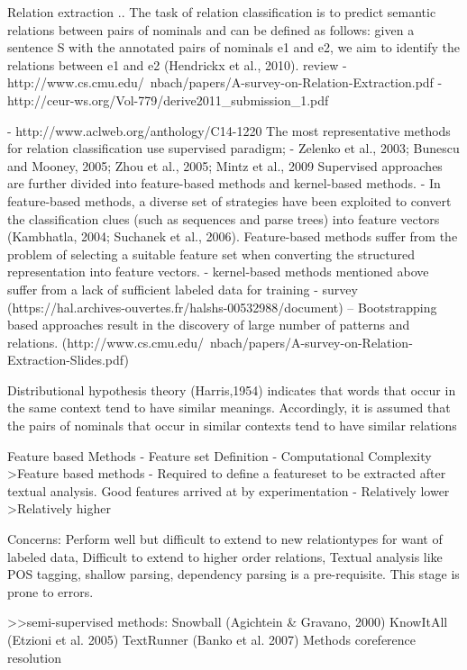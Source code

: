 \documentclass[12pt]{article}
\begin{document}
Relation extraction ..
The task of relation classification is to predict semantic relations between pairs of nominals and can
be defined as follows: given a sentence S with the annotated pairs of nominals e1 and e2, we aim
to identify the relations between e1 and e2 (Hendrickx et al., 2010). 
review
- http://www.cs.cmu.edu/~nbach/papers/A-survey-on-Relation-Extraction.pdf
- http://ceur-ws.org/Vol-779/derive2011_submission_1.pdf

- http://www.aclweb.org/anthology/C14-1220
The most representative methods for relation classification use supervised paradigm;
- Zelenko et al., 2003; Bunescu and Mooney, 2005; Zhou et al., 2005; Mintz et al., 2009
Supervised approaches are further divided into feature-based methods and kernel-based methods.
- In feature-based methods, a diverse set of strategies
have been exploited to convert the classification clues (such as sequences and parse trees) into feature
vectors (Kambhatla, 2004; Suchanek et al., 2006). Feature-based methods suffer from the problem
of selecting a suitable feature set when converting the structured representation into feature vectors.
- kernel-based methods
mentioned above suffer from a lack of sufficient labeled data for training
- survey (https://hal.archives-ouvertes.fr/halshs-00532988/document)
– Bootstrapping based approaches result in the discovery of large
number of patterns and relations. (http://www.cs.cmu.edu/~nbach/papers/A-survey-on-Relation-Extraction-Slides.pdf)

Distributional hypothesis theory (Harris,1954) indicates that words that occur in the same context tend to have similar meanings. Accordingly, it is assumed that the pairs of nominals that occur in similar contexts tend to have similar relations

Feature based
Methods - Feature set Definition	- Computational Complexity
>Feature based	methods
- Required to define a featureset
to be extracted after
textual analysis. Good features
arrived at by experimentation
- Relatively lower
>Relatively higher

Concerns: 
Perform well but difficult to extend to new relationtypes
for want of labeled data, Difficult to extend to higher order relations, Textual analysis like POS tagging, shallow parsing,
dependency parsing is a pre-requisite. This stage is
prone to errors.

>>semi-supervised methods:
Snowball (Agichtein & Gravano, 2000)
KnowItAll (Etzioni et al. 2005)
TextRunner (Banko et al. 2007)
Methods
coreference resolution
\end{document}
